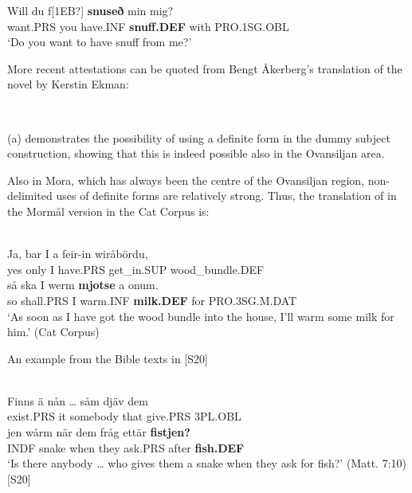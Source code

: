 \z
{} 
\ea
\gll Will  du  f[1EB?]  \textbf{snuseð} min  mig?\\
want.PRS  you  have.INF  \textbf{snuff.DEF} with  PRO.1SG.OBL\\
\glt  ‘Do you want to have snuff from me?’

\z

More recent attestations can be quoted from Bengt Åkerberg’s translation of the novel  by Kerstin Ekman:

\ea\label{}
\\
	\z
\z 
	
	(a) demonstrates the possibility of using a definite form in the dummy subject construction, showing that this is indeed possible also in the Ovansiljan area. 

Also in Mora, which has always been the centre of the Ovansiljan region, non-delimited uses of definite forms are relatively strong. Thus, the translation of  in the Mormål version in the Cat Corpus is:

\ea \label{} 
\\
\gll Ja,  bar  I  a  feir-in  wiråbördu,\\
yes  only  I  have.PRS  get\_in.SUP  wood\_bundle.DEF\\
\gll så  ska  I  werm  \textbf{mjotse} a  onum.\\
so  shall.PRS  I  warm.INF  \textbf{milk.DEF} for  PRO.3SG.M.DAT\\
\glt ‘As soon as I have got the wood bundle into the house, I’ll warm some milk for him.’ (Cat Corpus)

\z

An example from the Bible texts in [S20]\textstyleLinguisticExample{:}

\ea \label{} 
\\
\gll Finns  ä  nån  …  såm  djäv  dem\\
exist.PRS  it  somebody    that  give.PRS  3PL.OBL\\
\gll jen  wårm  när  dem  fråg  ettär  \textbf{fistjen?}\\
INDF  snake  when  they  ask.PRS  after  \textbf{fish.DEF}\\
\glt ‘Is there anybody … who gives them a snake when they ask for fish?’ (Matt. 7:10) [S20]

